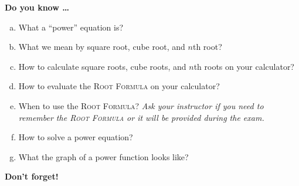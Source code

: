 \newpage



\bigskip

\noindent \textbf{Do you know \ldots} %

\begin{enumerate} [(a)]
\item What a ``power'' equation is? 
\item What we mean by square root, cube root, and $n$th root? 
\item How to calculate square roots, cube roots, and $n$th roots on your calculator? 
\item How to evaluate the \textsc{Root Formula} on your calculator?
\item When to use the \textsc{Root Formula}?  \emph{Ask your instructor if you need to remember the \textsc{Root Formula} or it will be provided during the exam.} 
\item How to solve a power equation? 
\item What the graph of a power function looks like? 
\end{enumerate}

\bigskip

\noindent \textbf{Don't forget!}
